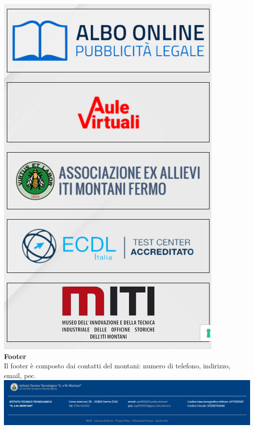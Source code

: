 \documentclass{article}
\begin{document}
	\centering
\includegraphics[scale=0.4]{servizi}\\
\flushleft
	\textbf{Footer}\\
Il footer è composto dai contatti del montani: numero di telefono, indirizzo, email, pec.
\includegraphics[scale=0.35]{footer}\\
\end{document}
